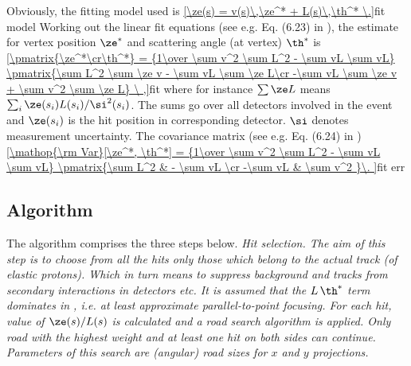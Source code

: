 Obviously, the fitting model used is
\eqref{\ze(s) = v(s)\,\ze^* + L(s)\,\th^* \.}{fit model}
Working out the linear fit equations (see e.g. Eq. (6.23) in ), the estimate for vertex position $\ze^*$ and scattering angle (at vertex) $\th^*$ is
\eqref{\pmatrix{\ze^*\cr\th^*} = {1\over \sum v^2 \sum L^2 - \sum vL \sum vL} \pmatrix{\sum L^2 \sum \ze v - \sum vL \sum \ze L\cr -\sum vL \sum \ze v + \sum v^2 \sum \ze L} \ ,}{fit}
where for instance $\sum \ze L$ means $\sum_{i} \ze(s_i) L(s_i) / \si^2(s_i)$. The sums go over all detectors involved in the event and $\ze(s_i)$ is the hit position in corresponding detector. $\si$ denotes measurement uncertainty. The covariance matrix (see e.g. Eq. (6.24) in )
\eqref{\mathop{\rm Var}[\ze^*, \th^*] = {1\over \sum v^2 \sum L^2 - \sum vL \sum vL} \pmatrix{\sum L^2 & - \sum vL \cr -\sum vL & \sum v^2 }\.
}{fit err}

\iffalse
In case of symmetric optic, i.e.
$$L(-s) = - L(s),\qquad v(-s) = v(s)\eqno(3)$$
and symmetric measurement (simultaneously at $\pm 216$ and/or $\pm220$) one gets condition $\sum Lv = 0$. It simplifies the general formula (2) to
$$\pmatrix{\ze^*\cr\th^*} = \pmatrix{\sum \ze v / \sum v^2\cr \sum \ze L / \sum L^2}.\eqno{(4)}$$
The expression for $\th^*$ can be further expanded
$$\th^* = {1\over 2} {L(216) \big(\ze(216) - \ze(-216)\big)\ +\ L(220)\big( \ze(220) - \ze(-220) \big) \over L^2(216) + L^2(220)}\eqno{(5)}$$
\fi

\subsection[algo]{Algorithm}

The algorithm comprises the three steps below.
\bitm
\itm \em{Hit selection}. The aim of this step is to choose from all the hits only those which belong to the actual track (of elastic protons). Which in turn means to suppress background and tracks from secondary interactions in detectors etc. It is assumed that the $L\,\th^*$ term dominates in , i.e\hbox{.} at least approximate parallel-to-point focusing. For each hit, value of $\ze(s) / L(s)$ is calculated and a road search algorithm is applied. Only road with the highest weight and at least one hit on both sides can continue. Parameters of this search are (angular) road sizes for $x$ and $y$ projections.


